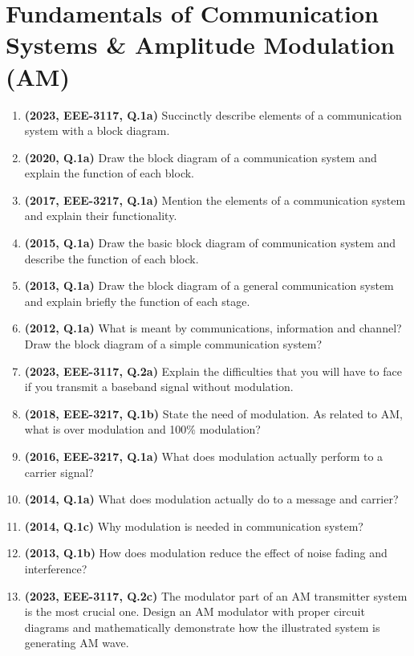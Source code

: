 \documentclass[12pt, a4paper]{article}
\begin{document}
	\section{Fundamentals of Communication Systems \& Amplitude Modulation (AM)}
	\begin{enumerate}
		\item \textbf{(2023, EEE-3117, Q.1a)} Succinctly describe elements of a communication system with a block diagram.
		\item \textbf{(2020, Q.1a)} Draw the block diagram of a communication system and explain the function of each block.
		\item \textbf{(2017, EEE-3217, Q.1a)} Mention the elements of a communication system and explain their functionality.
		\item \textbf{(2015, Q.1a)} Draw the basic block diagram of communication system and describe the function of each block.
		\item \textbf{(2013, Q.1a)} Draw the block diagram of a general communication system and explain briefly the function of each stage.
		\item \textbf{(2012, Q.1a)} What is meant by communications, information and channel? Draw the block diagram of a simple communication system?
		
		\item \textbf{(2023, EEE-3117, Q.2a)} Explain the difficulties that you will have to face if you transmit a baseband signal without modulation.
		\item \textbf{(2018, EEE-3217, Q.1b)} State the need of modulation. As related to AM, what is over modulation and 100\% modulation?
		\item \textbf{(2016, EEE-3217, Q.1a)} What does modulation actually perform to a carrier signal?
		\item \textbf{(2014, Q.1a)} What does modulation actually do to a message and carrier?
		\item \textbf{(2014, Q.1c)} Why modulation is needed in communication system?
		\item \textbf{(2013, Q.1b)} How does modulation reduce the effect of noise fading and interference?
		
		\item \textbf{(2023, EEE-3117, Q.2c)} The modulator part of an AM transmitter system is the most crucial one. Design an AM modulator with proper circuit diagrams and mathematically demonstrate how the illustrated system is generating AM wave.
		

\end{enumerate}
\end{document}
